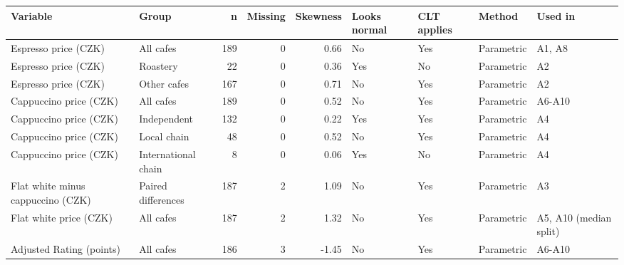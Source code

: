 \begin{tabular}{llrrrllll}
\toprule
Variable & Group & n & Missing & Skewness & Looks normal & CLT applies & Method & Used in \\
\midrule
Espresso price (CZK) & All cafes & 189 & 0 & 0.66 & No & Yes & Parametric & A1, A8 \\
Espresso price (CZK) & Roastery & 22 & 0 & 0.36 & Yes & No & Parametric & A2 \\
Espresso price (CZK) & Other cafes & 167 & 0 & 0.71 & No & Yes & Parametric & A2 \\
Cappuccino price (CZK) & All cafes & 189 & 0 & 0.52 & No & Yes & Parametric & A6-A10 \\
Cappuccino price (CZK) & Independent & 132 & 0 & 0.22 & Yes & Yes & Parametric & A4 \\
Cappuccino price (CZK) & Local chain & 48 & 0 & 0.52 & No & Yes & Parametric & A4 \\
Cappuccino price (CZK) & International chain & 8 & 0 & 0.06 & Yes & No & Parametric & A4 \\
Flat white minus cappuccino (CZK) & Paired differences & 187 & 2 & 1.09 & No & Yes & Parametric & A3 \\
Flat white price (CZK) & All cafes & 187 & 2 & 1.32 & No & Yes & Parametric & A5, A10 (median split) \\
Adjusted Rating (points) & All cafes & 186 & 3 & -1.45 & No & Yes & Parametric & A6-A10 \\
\bottomrule
\end{tabular}
